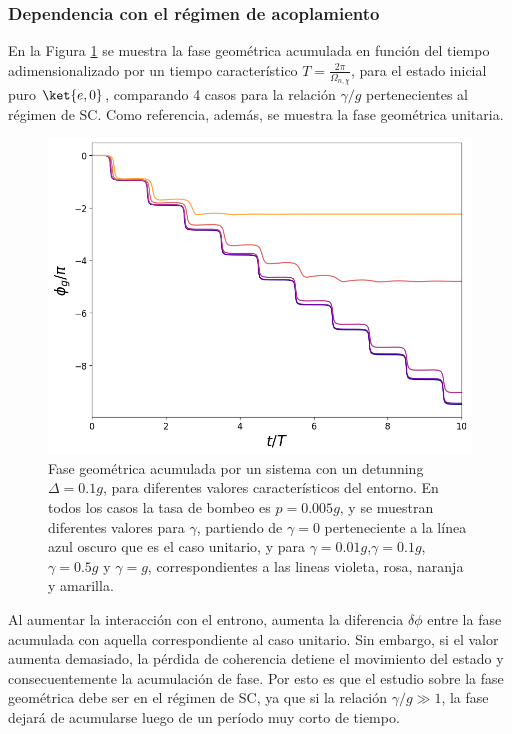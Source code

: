 \subsubsection{Dependencia con el régimen de acoplamiento}
En la Figura \ref{fig3:fg gamma} se muestra la fase geométrica acumulada en función del tiempo adimensionalizado por un tiempo característico $T=\frac{2\pi}{\Omega_{n,\chi}}$, para el estado inicial puro $\ket{e,0}$, comparando 4 casos para la relación $\gamma/g$ pertenecientes al régimen de SC. Como referencia, además, se muestra la fase geométrica unitaria.
\begin{figure}[H]
    \begin{minipage}[c]{0.67\textwidth}
        \includegraphics[width=\textwidth]{figuras/ch3/fg gamma.png}
      \end{minipage}\hfill
      \begin{minipage}[c]{0.3\textwidth}
        \caption{
            Fase geométrica acumulada por un sistema con un detunning $\Delta=0.1g$, para diferentes valores característicos del entorno. En todos los casos la tasa de bombeo es $p=0.005g$, y se muestran diferentes valores para $\gamma$, partiendo de $\gamma=0$ perteneciente a la línea azul oscuro que es el caso unitario, y para $\gamma=0.01g$,$\gamma=0.1g$,$\gamma=0.5g$ y $\gamma=g$, correspondientes a las lineas violeta, rosa, naranja y amarilla.
        } \label{fig3:fg gamma}
      \end{minipage}
\end{figure}
Al aumentar la interacción con el entrono, aumenta la diferencia $\delta \phi$ entre la fase acumulada con aquella correspondiente al caso unitario. Sin embargo, si el valor aumenta demasiado, la pérdida de coherencia detiene el movimiento del estado y consecuentemente la acumulación de fase. Por esto es que el estudio sobre la fase geométrica debe ser en el régimen de SC, ya que si la relación $\gamma/g\gg 1$, la fase dejará de acumularse luego de un período muy corto de tiempo.


